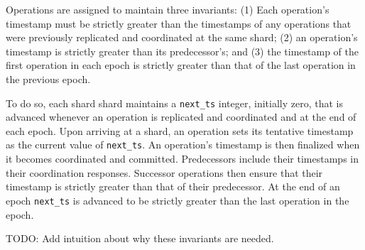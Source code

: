 Operations are assigned to maintain three invariants: (1) Each operation's timestamp must
be strictly greater than the timestamps of any operations that were previously replicated and coordinated
at the same shard; (2) an operation's timestamp is strictly greater than its predecessor's; and (3)
the timestamp of the first operation in each epoch is strictly greater than that of the last operation
in the previous epoch. 

To do so, each shard shard maintains a \texttt{next\_ts} integer, initially zero, that is advanced whenever
an operation is replicated and coordinated and at the end of each epoch. Upon arriving at a shard, an operation
sets its tentative timestamp as the current value of \texttt{next\_ts}. An operation's timestamp is then
finalized when it becomes coordinated and committed. Predecessors include their timestamps in their coordination
responses. Successor operations then ensure that their timestamp is strictly greater than that
of their predecessor. At the end of an epoch \texttt{next\_ts} is advanced to be strictly greater than the last
operation in the epoch.

TODO: Add intuition about why these invariants are needed.




